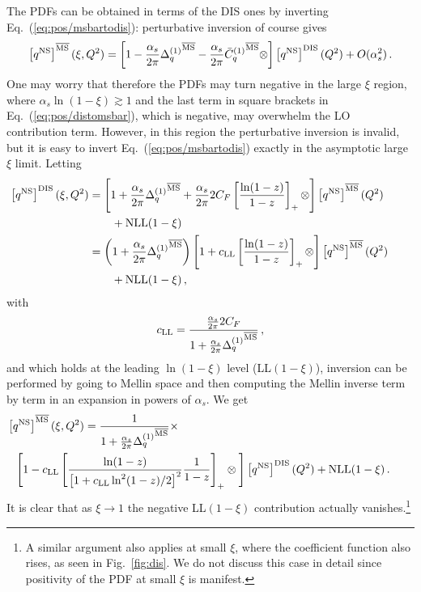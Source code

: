 The \msbar{} PDFs can be obtained in terms of the DIS ones by inverting
Eq.~(\ref{eq:pos/msbartodis}): perturbative inversion of course gives
\begin{equation}\label{eq:pos/distomsbar}
\left[{q^{{\textrm{NS}}}}\right]^{{\overline{\textrm{MS}}}}(\xi,Q^2)=
\left[1-\frac{\alpha_s}{2\pi} {\Delta^{(1)}_q}^{{\overline{\textrm{MS}}}}
  -\frac{\alpha_s}{2\pi}  {\bar
    C^{(1)}_q{}}^{{\overline{\textrm{MS}}}}\otimes\right]\left[{q^{{\textrm{NS}}}}\right]^{\textrm{DIS}}(Q^2)
+O(\alpha_s^2) \,.
\end{equation}
One may worry that therefore the \msbar{} PDFs may turn negative in the
large $\xi$ region, where $\alpha_s\ln(1-\xi)\gtrsim 1$ and the last term
in square brackets in Eq.~(\ref{eq:pos/distomsbar}), which is negative, may overwhelm the LO
contribution 
term. However, in this region the perturbative
inversion is invalid, but it is easy to invert
Eq.~(\ref{eq:pos/msbartodis}) exactly in the asymptotic large $\xi$ limit.
Letting
\begin{align}\label{eq:pos/msbartodisp}
    \hspace{-20pt}\left[{q^{\NS}}\right]^{\textrm{DIS}}(\xi,Q^2)&=
\left[1+\frac{\alpha_s}{2\pi} {\Delta^{(1)}_q}^{\mmsbar}
  +\frac{\alpha_s}{2\pi} 2C_F\left[\frac{\ln(1-z)}{1-z}\right]_+
  \otimes\right]\left[{q^{\NS}}\right]^{\mmsbar}(Q^2)\nonumber\\
    &\qquad+ \hbox{NLL}(1-\xi)\\
\label{eq:pos/msbartodisp1}
    &= \left(1+\frac{\alpha_s}{2\pi} {\Delta^{(1)}_q}^{\mmsbar}\right) 
\left[1+c_{\textrm{LL}}\left[\frac{\ln(1-z)}{1-z}\right]_+
\otimes\right]\left[{q^{\NS}}\right]^{\mmsbar}(Q^2)\nonumber\\
    &\qquad+ \hbox{NLL}(1-\xi) \,,
\end{align}
with
\begin{equation}
    \label{eq:pos/msbartodiscoeff}
    c_{\textrm{LL}} = \frac{\frac{\alpha_s}{2\pi} 2C_F}{1+\frac{\alpha_s}{2\pi} {\Delta^{(1)}_q}^{{\overline{\textrm{MS}}}}} \,, 
\end{equation}
and which holds at the leading $\ln(1-\xi)$ level (LL$(1-\xi)$),
inversion can be performed by going to Mellin space and then computing
the Mellin inverse term by term in an expansion in powers of $\alpha_s$.
We get
\begin{align}\label{eq:pos/distomsbarllx}
    \hspace*{-20pt} \left[{q^{\NS}}\right]^{\mmsbar}(\xi,Q^2) &= \frac{1}{1+\frac{\alpha_s}{2\pi} {\Delta^{(1)}_q}^{\mmsbar}} \times \nonumber\\
    &\hspace*{-60pt}\Bigg[1 -c_{\textrm{LL}} \left[ \frac{\ln(1-z)}{\left[1+c_{\textrm{LL}}\ln^2(1-z)/2\right]^2}  \frac{1}{1-z}\right]_+
\otimes\Bigg]\left[{q^{\NS}}\right]^{\textrm{DIS}}(Q^2) + \hbox{NLL}(1-\xi) \,.
\end{align}
It is clear that as $\xi\to 1$ the negative LL$(1-\xi)$ contribution
actually vanishes.\footnote{A similar argument also applies at small
  $\xi$, where the coefficient function also rises, as seen in
  Fig.~\ref{fig:dis}. We do not discuss this case in detail since
  positivity of the \msbar{} PDF at small $\xi$ is manifest.}




